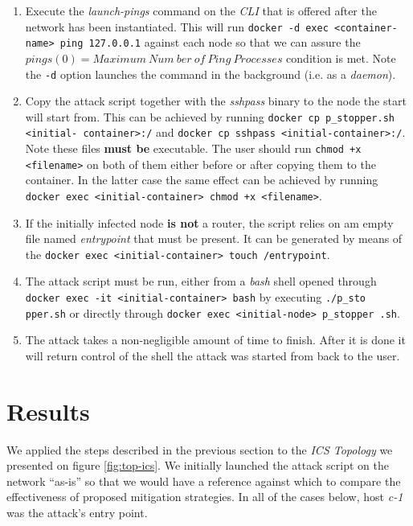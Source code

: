         \begin{enumerate}
            \item Execute the \textit{launch-pings} command on the \textit{CLI} that is offered after the network has been instantiated. This will run \texttt{docker -d exec <container-name> ping 127.0.0.1} against each node so that we can assure the $pings(0) = Maximum\ Num\ \allowbreak ber\ of\ Ping\ Processes$ condition is met. Note the \texttt{-d} option launches the command in the background (i.e. as a \textit{daemon}).
            \item Copy the attack script together with the \textit{sshpass} binary to the node the start will start from. This can be achieved by running \texttt{docker cp p\_stopper.sh <initial- \allowbreak container>:/} and \texttt{docker cp sshpass <initial-container>:/}. Note these files \textbf{must be} executable. The user should run \texttt{chmod +x <filename>} on both of them either before or after copying them to the container. In the latter case the same effect can be achieved by running \texttt{docker exec <initial-container> chmod +x <filename>}.
            \item If the initially infected node \textbf{is not} a router, the script relies on am empty file named \textit{entrypoint} that must be present. It can be generated by means of the \texttt{docker exec <initial-container> touch /entrypoint}.
            \item The attack script must be run, either from a \textit{bash} shell opened through \texttt{docker exec -it <initial-container> bash} by executing \texttt{./p\_sto pper.sh} or directly through \texttt{docker exec <initial-node> p\_stopper .sh}.
            \item The attack takes a non-negligible amount of time to finish. After it is done it will return control of the shell the attack was started from back to the user.
        \end{enumerate}

    \section{Results}
        We applied the steps described in the previous section to the \textit{ICS Topology} we presented on figure \ref{fig:top-ics}. We initially launched the attack script on the network ``as-is'' so that we would have a reference against which to compare the effectiveness of proposed mitigation strategies. In all of the cases below, host \textit{c-1} was the attack's entry point.\\


